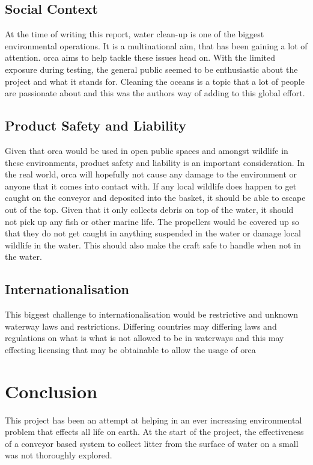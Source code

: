 \documentclass [11pt]{article}
\begin{document}
\subsection{Social Context}
At the time of writing this report, water clean-up is one of the biggest environmental operations. It is a multinational aim, that has been gaining a lot of attention. \gls{orca} aims to help tackle these issues head on. With the limited exposure during testing, the general public seemed to be enthusiastic about the project and what it stands for. Cleaning the oceans is a topic that a lot of people are passionate about and this was the authors way of adding to this global effort. 

\subsection{Product Safety and Liability}
Given that \gls{orca} would be used in open public spaces and amongst wildlife in these environments, product safety and liability is an important consideration. In the real world, \gls{orca} will hopefully not cause any damage to the environment or anyone that it comes into contact with. If any local wildlife does happen to get caught on the conveyor and deposited into the basket, it should be able to escape out of the top. Given that it only collects debris on top of the water, it should not pick up any fish or other marine life. The propellers would be covered up so that they do not get caught in anything suspended in the water or damage local wildlife in the water. This should also make the craft safe to handle when not in the water. 

\subsection{Internationalisation}
 This biggest challenge to internationalisation would be restrictive and unknown waterway laws and restrictions. Differing countries may differing laws and regulations on what is what is not allowed to be in waterways and this may effecting licensing that may be obtainable to allow the usage of \gls{orca}

\section{Conclusion}
This project has been an attempt at helping in an ever increasing environmental problem that effects all life on earth. At the start of the project, the effectiveness of a conveyor based system to collect litter from the surface of water on a small was not thoroughly explored. 
\end{document}
